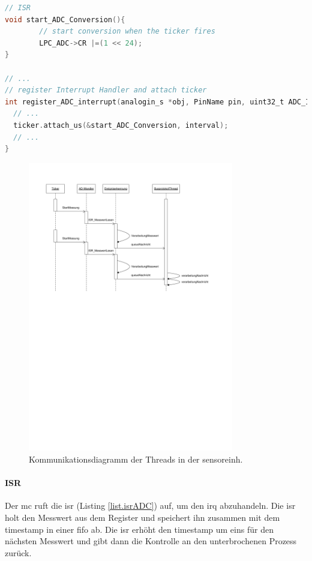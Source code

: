 \begin{lstlisting}[language=C,caption=Timer mit Aufruf der A/D-Wandler-Funktion (ADC\_4088.cpp), label=list.tickerADC]
// ISR 
void start_ADC_Conversion(){
		// start conversion when the ticker fires
		LPC_ADC->CR |=(1 << 24);
}

// ...
// register Interrupt Handler and attach ticker
int register_ADC_interrupt(analogin_s *obj, PinName pin, uint32_t ADC_IRQHandler, uint32_t interval){
  // ...
  ticker.attach_us(&start_ADC_Conversion, interval);
  // ...
}
\end{lstlisting}
\clearpage
\begin{figure}
	\centering
		\includegraphics[width=0.8\textwidth]{images/visio/AD-Er-Com.pdf}
	\caption{Kommunikationsdiagramm der Threads in der \gls{sensoreinh}.}
	\label{fig.commsensor}
\end{figure}



\paragraph{ISR} Der \gls{mc} ruft die \gls{isr} (Listing \ref{list.isrADC}) auf, um den \gls{irq} abzuhandeln. Die \gls{isr} holt den Messwert aus dem Register und speichert ihn zusammen mit dem \gls{timestamp} in einer \gls{fifo} ab. Die \gls{isr} erhöht den \gls{timestamp} um eins für den nächsten Messwert und gibt dann die Kontrolle an den unterbrochenen Prozess zurück.

